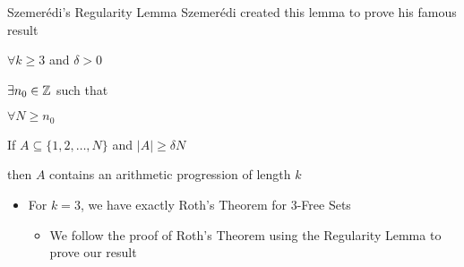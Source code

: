 \begin{frame}{Szemer\'{e}di's Regularity Lemma}
Szemer\'{e}di created this lemma to prove his famous result

{
\begin{theorem}
$\forall k \geq 3$ and $\delta > 0$
\begin{description}[abc]
	\item<2->[$\bullet$] $\exists n_0 \in {\mathbb Z}$ such that
	\begin{description}[abc]
		\item<3->[$\bullet$] $\forall N \geq n_0$
		\begin{description}[abc]
			\item<4->[$\bullet$] If $A \subseteq \{1,2,\dotsc,N\}$ and $|A| \geq \delta N$
			\begin{description}[abc]
				\item<5->[$\bullet$] then $A$ contains an arithmetic progression of length $k$
			\end{description}
		\end{description}
	\end{description}
\end{description}
\end{theorem}}

\begin{itemize}
	\item<6-> For $k = 3$, we have exactly Roth's Theorem for 3-Free Sets
	\begin{itemize}
		\item We follow the proof of Roth's Theorem using the Regularity Lemma to prove our result
	\end{itemize}
\end{itemize}
\end{frame}


